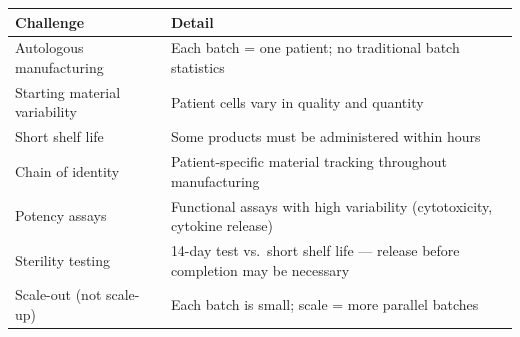\documentclass[
  11pt,
  a4paper,
]{report}
\begin{document}
\begin{longtable}[]{@{}ll@{}}
\toprule
\begin{minipage}[b]{0.54\columnwidth}\raggedright
Challenge\strut
\end{minipage} & \begin{minipage}[b]{0.40\columnwidth}\raggedright
Detail\strut
\end{minipage}\tabularnewline
\midrule
\endhead
\begin{minipage}[t]{0.54\columnwidth}\raggedright
Autologous manufacturing\strut
\end{minipage} & \begin{minipage}[t]{0.40\columnwidth}\raggedright
Each batch = one patient; no traditional batch statistics\strut
\end{minipage}\tabularnewline
\begin{minipage}[t]{0.54\columnwidth}\raggedright
Starting material variability\strut
\end{minipage} & \begin{minipage}[t]{0.40\columnwidth}\raggedright
Patient cells vary in quality and quantity\strut
\end{minipage}\tabularnewline
\begin{minipage}[t]{0.54\columnwidth}\raggedright
Short shelf life\strut
\end{minipage} & \begin{minipage}[t]{0.40\columnwidth}\raggedright
Some products must be administered within hours\strut
\end{minipage}\tabularnewline
\begin{minipage}[t]{0.54\columnwidth}\raggedright
Chain of identity\strut
\end{minipage} & \begin{minipage}[t]{0.40\columnwidth}\raggedright
Patient-specific material tracking throughout manufacturing\strut
\end{minipage}\tabularnewline
\begin{minipage}[t]{0.54\columnwidth}\raggedright
Potency assays\strut
\end{minipage} & \begin{minipage}[t]{0.40\columnwidth}\raggedright
Functional assays with high variability (cytotoxicity, cytokine
release)\strut
\end{minipage}\tabularnewline
\begin{minipage}[t]{0.54\columnwidth}\raggedright
Sterility testing\strut
\end{minipage} & \begin{minipage}[t]{0.40\columnwidth}\raggedright
14-day test vs.~short shelf life --- release before completion may be
necessary\strut
\end{minipage}\tabularnewline
\begin{minipage}[t]{0.54\columnwidth}\raggedright
Scale-out (not scale-up)\strut
\end{minipage} & \begin{minipage}[t]{0.40\columnwidth}\raggedright
Each batch is small; scale = more parallel batches\strut
\end{minipage}\tabularnewline
\bottomrule
\end{longtable}
\end{document}
